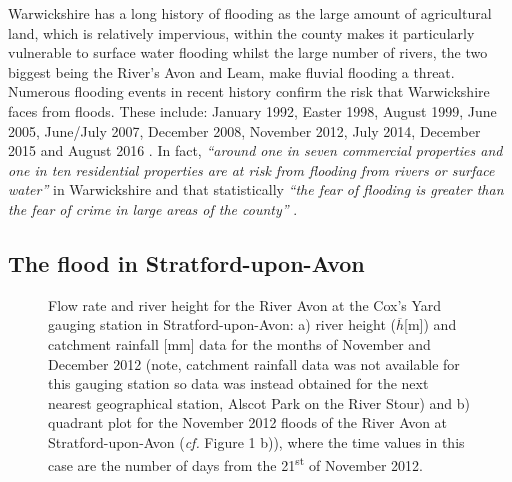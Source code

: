 \documentclass[11pt,a4paper]{article}
\begin{document}
Warwickshire has a long history of flooding as the large amount of agricultural land, which is relatively impervious, within the county makes it particularly vulnerable to surface water flooding whilst the large number of rivers, the two biggest being the River's Avon and Leam, make fluvial flooding a threat. Numerous flooding events in recent history confirm the risk that Warwickshire faces from floods. These include: January 1992, Easter 1998, August 1999, June 2005, June/July 2007, December 2008, November 2012, July 2014, December 2015 and August 2016 \cite{war2}. In fact, \textit{``around one in seven commercial properties and one in ten residential properties are at risk from flooding from rivers or surface water''} \cite{war1} in Warwickshire and that statistically \textit{``the fear of flooding is greater than the fear of crime in large areas of the county''} \cite{war1}. 

\subsection{The flood in Stratford-upon-Avon}
\begin{figure}[ht!]
\centering
{}
\hfill
{}
\caption{Flow rate and river height for the River Avon at the Cox's Yard gauging station in Stratford-upon-Avon: a) river height ($\overline{h}$[m]) \cite{EA} and catchment rainfall [mm] data \cite{NRFA} for the months of November and December 2012 (note, catchment rainfall data was not available for this gauging station so data was instead obtained for the next nearest geographical station, Alscot Park on the River Stour) and b) quadrant plot for the November 2012 floods of the River Avon at Stratford-upon-Avon (\textit{cf.} Figure 1 b)), where the time values in this case are the number of days from the 21\textsuperscript{st} of November 2012.}
\end{figure}
\end{document}
